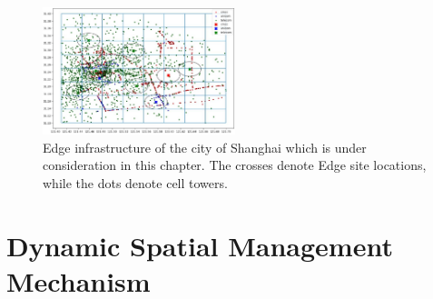 \begin{figure}
\centering
\includegraphics[width=0.5\textwidth]{figures/mechanisms/shanghai_infrastructure.JPG}
\caption{Edge infrastructure of the city of Shanghai which is under consideration in this chapter. The crosses denote Edge site locations, while the dots denote cell towers. }
\label{fig:shanghai_infra}
\end{figure}

\section{Dynamic Spatial Management Mechanism}
\label{sec:spatial_ctx_mgmt}

